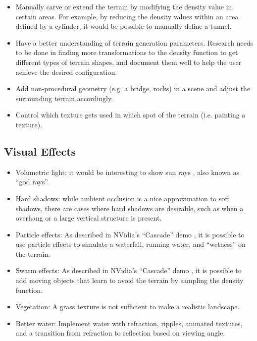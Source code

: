\documentclass {article}
\begin{document}
\begin{itemize}
\item Manually carve or extend the terrain by modifying the density value in certain areas. For example, by reducing the density values within an area defined by a cylinder, it would be possible to manually define a tunnel.
\item Have a better understanding of terrain generation parameters. Research needs to be done in finding more transformations to the density function to get different types of terrain shapes, and document them well to help the user achieve the desired configuration.
\item Add non-procedural geometry (e.g. a bridge, rocks) in a scene and adjust the surrounding terrain accordingly.
\item Control which texture gets used in which spot of the terrain (i.e. painting a texture).
\end{itemize}

\subsection{Visual Effects}

\begin{itemize}
\item Volumetric light: it would be interesting to show sun rays \cite{Nguyen:2007:GG:1407436}\cite{GPUPro5}, also known as ``god rays''.
\item Hard shadows: while ambient occlusion is a nice approximation to soft shadows, there are cases where hard shadows are desirable, such as when a overhang or a large vertical structure is present.
\item Particle effects: As described in NVidia's ``Cascade'' demo \cite{Cascades}, it is possible to use particle effects to simulate a waterfall, running water, and ``wetness'' on the terrain.
\item Swarm effects: As described in NVidia's ``Cascade'' demo \cite{Cascades}, it is possible to add moving objects that learn to avoid the terrain by sampling the density function.
\item Vegetation: A grass texture is not sufficient to make a realistic landscape.
\item Better water: Implement water with refraction, ripples, animated textures, and a transition from refraction to reflection based on viewing angle.
\end{itemize}
\end{document}
